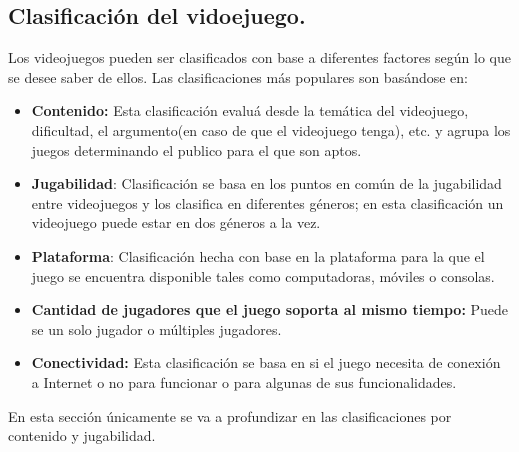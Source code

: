 	\subsection{Clasificación del vidoejuego.}\label{ClasiVideojuego}
	Los videojuegos pueden ser clasificados con base a diferentes factores según lo que 
	se desee saber de ellos. Las clasificaciones más populares son basándose en:
        \begin{itemize}     
                \item \textbf{Contenido:} Esta clasificación evaluá desde la temática
                 del videojuego, dificultad, el argumento(en caso de que el videojuego 
                 tenga), etc. y agrupa los juegos determinando el publico para el que 
                 son aptos.
                \item \textbf{Jugabilidad}: Clasificación se basa en los puntos en común 
                de la jugabilidad entre videojuegos y los clasifica en diferentes 
                géneros; en esta clasificación un videojuego puede estar en dos géneros 
                a la vez.
                \item \textbf{Plataforma}: Clasificación hecha con base en la 
                plataforma para la que el juego se encuentra disponible tales como
                 computadoras, móviles o consolas.
                \item \textbf{Cantidad de jugadores que el juego soporta al mismo
                 tiempo:} Puede se un solo jugador o múltiples jugadores.
                \item \textbf{Conectividad:} Esta clasificación se basa en si 
                el juego necesita de conexión a Internet o no para funcionar o para 
                algunas de sus funcionalidades. 
        \end{itemize}
        En esta sección únicamente se va a profundizar en las clasificaciones por 
        contenido y jugabilidad.      
	
